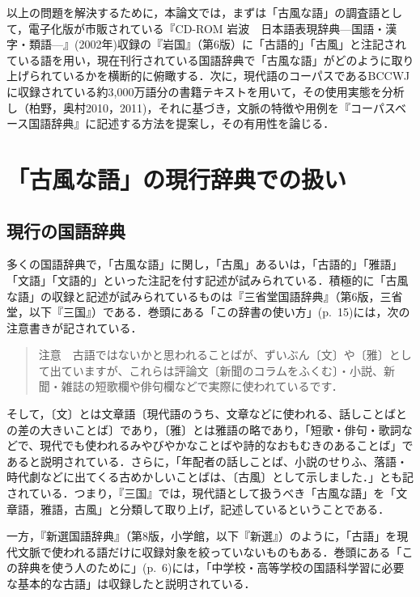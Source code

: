 \documentclass[japanese]{jnlp_1.4}
\begin{document}
以上の問題を解決するために，本論文では，まずは「古風な語」の調査語として，電子化版が市販されている『CD-ROM 岩波　日本語表現辞典—国語・漢字・類語—』(2002年)収録の『岩国』（第6版）に「古語的」「古風」と注記されている語を用い，現在刊行されている国語辞典で「古風な語」がどのように取り上げられているかを横断的に俯瞰する．次に，現代語のコーパスであるBCCWJに収録されている約3,000万語分の書籍テキストを用いて，その使用実態を分析し（柏野，奥村2010，2011)，それに基づき，文脈の特徴や用例を『コーパスベース国語辞典』に記述する方法を提案し，その有用性を論じる．


\section{「古風な語」の現行辞典での扱い}

\subsection{現行の国語辞典}

多くの国語辞典で，「古風な語」に関し，「古風」あるいは，「古語的」「雅語」「文語」「文語的」といった注記を付す記述が試みられている．積極的に「古風な語」の収録と記述が試みられているものは『三省堂国語辞典』（第6版，三省堂，以下『三国』）である．巻頭にある「この辞書の使い方」(p.~15)には，次の注意書きが記されている．

\vspace{1\Cvs}
\begin{quotation}
\noindent
注意　古語ではないかと思われることばが、ずいぶん〔文〕や〔雅〕として出ていますが、これらは評論文〔新聞のコラムをふくむ〕・小説、新聞・雑誌の短歌欄や俳句欄などで実際に使われているです．
\end{quotation}
\vspace{1\Cvs}

そして，〔文〕とは文章語〔現代語のうち、文章などに使われる、話しことばとの差の大きいことば〕であり，〔雅〕とは雅語の略であり，「短歌・俳句・歌詞などで、現代でも使われるみやびやかなことばや詩的なおもむきのあることば」であると説明されている．さらに，「年配者の話しことば、小説のせりふ、落語・時代劇などに出てくる古めかしいことばは、〔古風〕として示しました．」とも記されている．つまり，『三国』では，現代語として扱うべき「古風な語」を「文章語，雅語，古風」と分類して取り上げ，記述しているということである．

一方，『新選国語辞典』（第8版，小学館，以下『新選』）のように，「古語」を現代文脈で使われる語だけに収録対象を絞っていないものもある．巻頭にある「この辞典を使う人のために」(p.~6)には，「中学校・高等学校の国語科学習に必要な基本的な古語」は収録したと説明されている．
\end{document}
